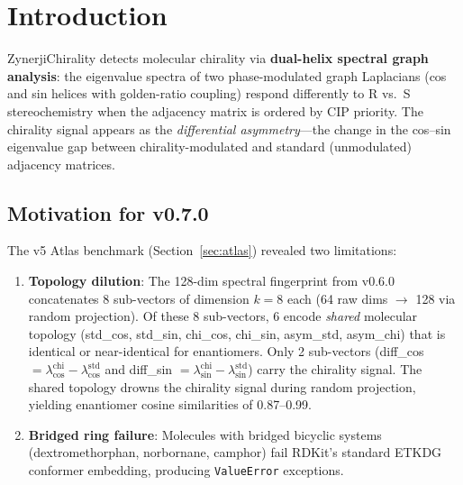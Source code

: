 \documentclass[11pt,a4paper]{article}
\begin{document}
\begin{titlepage}
\begin{abstract}
Additionally, v0.7.0 fixes conformer embedding for bridged bicyclic molecules (norbornane, camphor, dextromethorphan) via a dedicated fallback chain with MMFF optimization at all stages, and exposes both fingerprint types directly on the \texttt{ChiralityResult} object for downstream ML pipelines.
\end{abstract}

\end{titlepage}

\tableofcontents
\newpage

\section{Introduction}

ZynerjiChirality detects molecular chirality via \textbf{dual-helix spectral graph analysis}: the eigenvalue spectra of two phase-modulated graph Laplacians (cos and sin helices with golden-ratio coupling) respond differently to R vs.\ S stereochemistry when the adjacency matrix is ordered by CIP priority. The chirality signal appears as the \emph{differential asymmetry}---the change in the cos--sin eigenvalue gap between chirality-modulated and standard (unmodulated) adjacency matrices.

\subsection{Motivation for v0.7.0}

The v5 Atlas benchmark (Section~\ref{sec:atlas}) revealed two limitations:

\begin{enumerate}[leftmargin=*]
    \item \textbf{Topology dilution}: The 128-dim spectral fingerprint from v0.6.0 concatenates 8 sub-vectors of dimension $k=8$ each (64 raw dims $\to$ 128 via random projection). Of these 8 sub-vectors, 6 encode \emph{shared} molecular topology (std\_cos, std\_sin, chi\_cos, chi\_sin, asym\_std, asym\_chi) that is identical or near-identical for enantiomers. Only 2 sub-vectors (diff\_cos $= \lambda^{\text{chi}}_{\cos} - \lambda^{\text{std}}_{\cos}$ and diff\_sin $= \lambda^{\text{chi}}_{\sin} - \lambda^{\text{std}}_{\sin}$) carry the chirality signal. The shared topology drowns the chirality signal during random projection, yielding enantiomer cosine similarities of 0.87--0.99.

    \item \textbf{Bridged ring failure}: Molecules with bridged bicyclic systems (dextromethorphan, norbornane, camphor) fail RDKit's standard ETKDG conformer embedding, producing \texttt{ValueError} exceptions.
\end{enumerate}
\end{document}
